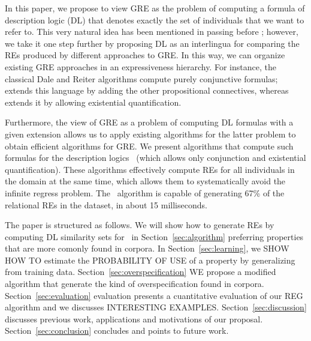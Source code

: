 In this paper, we propose to view GRE as the problem of computing a
formula of description logic (DL) that denotes exactly the set of
individuals that we want to refer to.  This very natural idea has been
mentioned in passing before
\cite{Krahmer2003,gardent07:_gener_bridg_defin_descr}; however, we
take it one step further by proposing DL as an interlingua for
comparing the REs produced by different approaches to GRE.  In this
way, we can organize existing GRE approaches in an expressiveness
hierarchy.  For instance, the classical Dale and Reiter algorithms
compute purely conjunctive formulas;
\cite{deemter02:_gener_refer_expres} extends this language by
adding the other propositional connectives, whereas
\cite{dale91:_gener_refer_expres_invol_relat} extends it by
allowing existential quantification.

Furthermore, the view of GRE as a problem of computing DL formulas
with a given extension allows us to apply existing algorithms for the
latter problem to obtain efficient algorithms for GRE.  We present
algorithms that compute such formulas for the description logics \el\
(which allows only conjunction and existential quantification).  These algorithms effectively
compute REs for all individuals in the domain at the same time, which
allows them to systematically avoid the infinite regress problem.  The
\el\ algorithm is capable of generating 67\% of the relational REs in
the \cite{viethen06:_algor_for_gener_refer_expres} dataset, in about
15 milliseconds.  


The paper is structured as follows. We will show how to generate REs by computing DL similarity sets for  \el\ in Section~\ref{sec:algorithm} preferring properties that are more comonly found in corpora.  In Section~\ref{sec:learning}, we SHOW HOW TO estimate the 
PROBABILITY OF USE of a property by generalizing from training data. Section~\ref{sec:overspecification}
WE propose a modified algorithm that generate the kind of overspecification found in corpora. Section~\ref{sec:evaluation} evaluation presents a cuantitative evaluation of our REG algorithm and we discusses INTERESTING EXAMPLES. Section~\ref{sec:discussion} discusses previous work, applications and motivations of our proposal. Section~\ref{sec:conclusion} concludes and points to future work.

